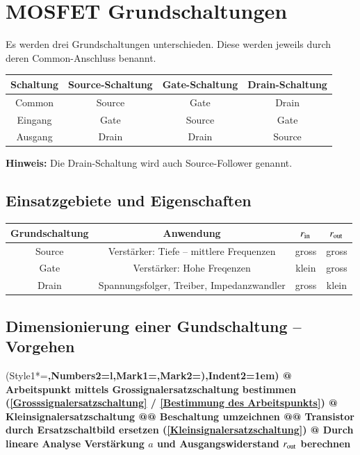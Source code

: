 \section{MOSFET Grundschaltungen}
Es werden drei Grundschaltungen unterschieden. 
Diese werden jeweils durch deren Common-Anschluss benannt.

\begin{center}
    \begingroup{}
    \begin{tabular}{|c|ccc|}
        \hline
        Schaltung   & Source-Schaltung & Gate-Schaltung & Drain-Schaltung \\
        \hline
        Common      & Source    & Gate      & Drain     \\
        Eingang     & Gate      & Source    & Gate      \\
        Ausgang     & Drain     & Drain     & Source    \\
        \hline
    \end{tabular}\endgroup
\end{center}

\textbf{Hinweis:} Die Drain-Schaltung wird auch Source-Follower genannt.


\subsection{Einsatzgebiete und Eigenschaften}

\begin{center}
    \begingroup{}
    \begin{tabular}{|c|ccc|}
        \hline
        Grundschaltung  & Anwendung                                 & $r_{\rm in}$  & $r_{\rm out}$ \\
        \hline
        Source          & Verstärker: Tiefe -- mittlere Frequenzen  & gross         & gross         \\
        Gate            & Verstärker: Hohe Freqenzen                & klein         & gross         \\
        Drain           & Spannungsfolger, Treiber, Impedanzwandler & gross         & klein         \\
        \hline
    \end{tabular}\endgroup
\end{center}

\subsection{Dimensionierung einer Gundschaltung -- Vorgehen}
\begin{easylist}
    \ListProperties(Style1*=\bfseries,Numbers2=l,Mark1={},Mark2={)},Indent2=1em)
    @ Arbeitspunkt mittels Grossignalersatzschaltung bestimmen (\ref{Grosssignalersatzschaltung} / \ref{Bestimmung des Arbeitspunkts})
    @ Kleinsignalersatzschaltung 
    @@ Beschaltung umzeichnen
    @@ Transistor durch Ersatzschaltbild ersetzen (\ref{Kleinsignalersatzschaltung})
    @ Durch lineare Analyse Verstärkung $a$ und Ausgangswiderstand $r_{\rm out}$ berechnen
\end{easylist}

